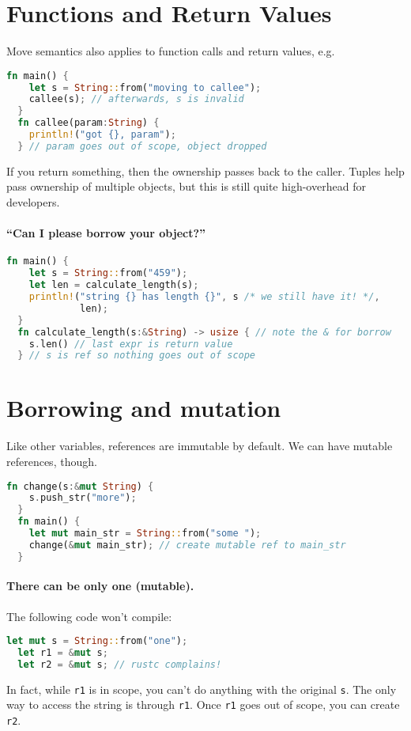 




\section*{Functions and Return Values}

Move semantics also applies to function calls and return values, e.g.
\begin{lstlisting}[language=Rust]
  fn main() {
    let s = String::from("moving to callee");
    callee(s); // afterwards, s is invalid
  }
  fn callee(param:String) {
    println!("got {}, param");
  } // param goes out of scope, object dropped
\end{lstlisting}
If you return something, then the ownership passes back to the caller.
Tuples help pass ownership of multiple objects, but this is still quite
high-overhead for developers.

\paragraph{``Can I please borrow your object?''}
\begin{lstlisting}[language=Rust]
  fn main() {
    let s = String::from("459");
    let len = calculate_length(s);
    println!("string {} has length {}", s /* we still have it! */,
             len);
  }
  fn calculate_length(s:&String) -> usize { // note the & for borrow
    s.len() // last expr is return value
  } // s is ref so nothing goes out of scope
\end{lstlisting}
  
\section*{Borrowing and mutation} Like other variables, references are immutable by default.
We can have mutable references, though.
\begin{lstlisting}[language=Rust]
  fn change(s:&mut String) {
    s.push_str("more");
  }
  fn main() {
    let mut main_str = String::from("some ");
    change(&mut main_str); // create mutable ref to main_str
  }
\end{lstlisting}

\paragraph{There can be only one (mutable).} The following code won't compile:
\begin{lstlisting}[language=Rust]
  let mut s = String::from("one");
  let r1 = &mut s;
  let r2 = &mut s; // rustc complains!
\end{lstlisting}
In fact, while {\tt r1} is in scope, you can't do anything with the original {\tt s}.
The only way to access the string is through {\tt r1}. Once {\tt r1} goes out of scope,
you can create {\tt r2}.

